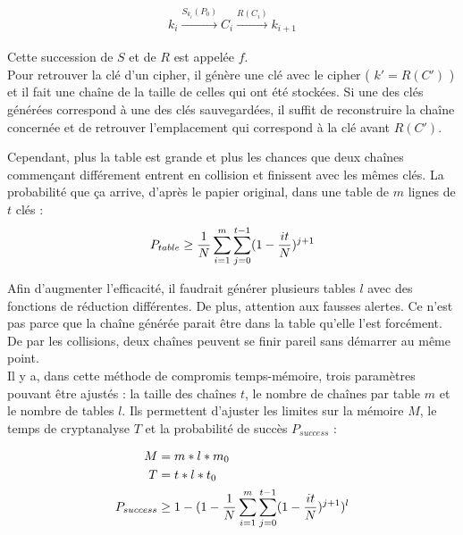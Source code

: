 	\begin{align*}
		k_i \overset{S_{k_i}(P_0)}{\longrightarrow} C_i \overset{R(C_i)}{\longrightarrow} k_{i+1}
	\end{align*}

	Cette succession de $S$ et de $R$ est appelée $f$.\\

	Pour retrouver la clé d'un \gls{cipher}, il génère une clé avec le \gls{cipher} ( $k' = R(C')$ ) et il fait une chaîne de la taille de celles qui ont été stockées. Si une des clés générées correspond à une des clés sauvegardées, il suffit de reconstruire la chaîne concernée et de retrouver l'emplacement qui correspond à la clé avant $R(C')$.

	Cependant, plus la table est grande et plus les chances que deux chaînes commençant différement entrent en collision et finissent avec les mêmes clés. La probabilité que ça arrive, d'après le papier original\cite{ehellman}, dans une table de $m$ lignes de $t$ clés :\\

	\begin{align*}
		P_{table} \ge{} \frac{1}{N} \sum\limits_{i=1}^{m}\sum\limits_{j=0}^{t-1} (1 - \frac{it}{N})^{j+1}
	\end{align*}

	Afin d'augmenter l'efficacité, il faudrait générer plusieurs tables $l$ avec des fonctions de réduction différentes. De plus, attention aux fausses alertes. Ce n'est pas parce que la chaîne générée parait être dans la table qu'elle l'est forcément. De par les collisions, deux chaînes peuvent se finir pareil sans démarrer au même point.\\

	Il y a, dans cette méthode de compromis temps-mémoire, trois paramètres pouvant être ajustés : la taille des chaînes $t$, le nombre de chaînes par table $m$ et le nombre de tables $l$. Ils permettent d'ajuster les limites sur la mémoire $M$, le temps de cryptanalyse $T$ et la probabilité de succès $P_{success}$\cite{Oech03} :

	\begin{align*}
		M &= m*l*m_0\\
		T &= t*l*t_0\\
		P_{success} &\ge{} 1 - (1 - \frac{1}{N} \sum\limits_{i=1}^{m}\sum\limits_{j=0}^{t-1} (1 - \frac{it}{N})^{j+1})^l
	\end{align*}

	\clearpage

\endinput{}
